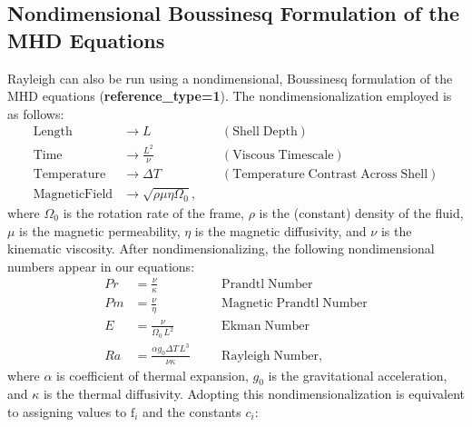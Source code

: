 \documentclass[10pt,letterpaper]{article}
\newcommand{\ff}{\mathrm{f}}
\begin{document}
\subsection{Nondimensional Boussinesq Formulation of the MHD Equations}
Rayleigh can also be run using a nondimensional, Boussinesq formulation of the MHD equations (\textbf{reference\_type=1}).  The nondimensionalization employed is as follows: 
\begin{align*}
	\mathrm{Length} &\rightarrow L &\;\;\;\; \mathrm{(Shell\; Depth)} \\
	\mathrm{Time} &\rightarrow   \frac{L^2}{\nu} &\;\;\;\; \mathrm{(Viscous\; Timescale)}\\
	\mathrm{Temperature} &\rightarrow \Delta T&\;\;\;\; \mathrm{(Temperature\; Contrast\; Across\; Shell)} \\
	\mathrm{Magnetic Field} &\rightarrow \sqrt{\rho\mu\eta\Omega_0},
\end{align*}
where $\Omega_0$ is the rotation rate of the frame, $\rho$ is the (constant) density of the fluid, $\mu$ is the magnetic permeability, $\eta$ is the magnetic diffusivity, and $\nu$ is the kinematic viscosity.  After nondimensionalizing, the following nondimensional numbers appear in our equations:
\begin{align*}
	Pr &=\frac{\nu}{\kappa}                          &\;\;\;\;\;\; \mathrm{Prandtl\; Number} \\
	Pm &=\frac{\nu}{\eta}                            &\;\;\;\;\;\; \mathrm{Magnetic\; Prandtl\; Number} \\
	E  &=\frac{\nu}{\Omega_0\,L^2}                   &\;\;\;\;\;\; \mathrm{Ekman\; Number} \\
	Ra &=\frac{\alpha g_0 \Delta T\,L^3}{\nu\kappa}  &\;\;\;\;\;\; \mathrm{Rayleigh\; Number},
\end{align*}
where $\alpha$ is coefficient of thermal expansion, $g_0$ is the gravitational acceleration, and $\kappa$ is the thermal diffusivity.  Adopting this nondimensionalization is equivalent to assigning values to $\ff_i$ and the constants $c_i$:
\end{document}

